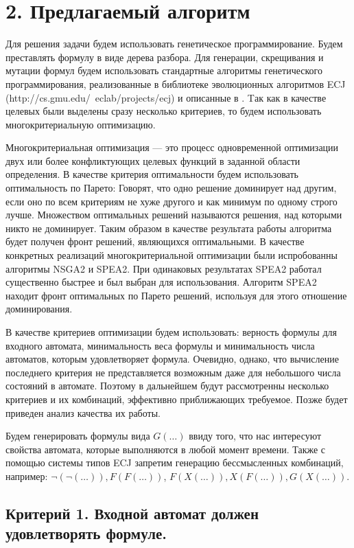 \documentclass[12pt,fleqn]{article}
\begin{document}
\section*{2. Предлагаемый алгоритм}

Для решения задачи будем использовать генетическое программирование. Будем преставлять формулу в виде дерева разбора.
Для генерации, скрещивания и мутации формул будем использовать стандартные алгоритмы генетического программирования,
реализованные в библиотеке эволюционных алгоритмов ECJ (http://cs.gmu.edu/~eclab/projects/ecj) и описанные в \cite{kz1,kz2}.
Tак как в качестве целевых были выделены сразу несколько критериев, то будем использовать многокритериальную оптимизацию.

Многокритериальная оптимизация --- это процесс одновременной оптимизации двух или более конфликтующих целевых функций
в заданной области определения. В качестве критерия оптимальности будем использовать оптимальность по Парето:
Говорят, что одно решение доминирует над другим, если оно по всем критериям не хуже другого и как минимум по одному
строго лучше. Множеством оптимальных решений называются решения, над которыми никто не доминирует. Таким образом
в качестве результата работы алгоритма будет получен фронт решений, являющихся оптимальными. В качестве конкретных
реализаций многокритериальной оптимизации были испробованны алгоритмы NSGA2\cite{nsga2} и SPEA2\cite{spea2}.
При одинаковых результатах SPEA2 работал существенно быстрее и был выбран для использования. Алгоритм SPEA2
находит фронт оптимальных по Парето решений, используя для этого отношение доминирования.

В качестве критериев оптимизации будем использовать: верность формулы для входного автомата, минимальность веса
формулы и минимальность числа автоматов, которым удовлетворяет формула. Очевидно, однако, что вычисление последнего
критерия не представляется возможным даже для небольшого числа состояний в автомате. Поэтому в дальнейшем будут
рассмотренны несколько критериев и их комбинаций, эффективно приближающих требуемое. Позже будет приведен
анализ качества их работы.

Будем генерировать формулы вида $G(\ldots)$ ввиду того, что нас интересуют свойства автомата, которые выполняются
в любой момент времени. Также с помощью системы типов ECJ запретим генерацию бессмысленных комбинаций, например:
$\lnot(\lnot(\ldots)), F(F(\ldots))$, $F(X(\ldots)), X(F(\ldots)), G(X(\ldots))$.

\subsection*{Критерий 1. Входной автомат должен удовлетворять формуле.}
\end{document}
